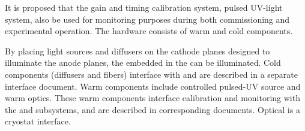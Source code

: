 





It is proposed that the \single {} gain and timing calibration system, pulsed UV-light system, also be used for  monitoring purposes during both commissioning and experimental operation. The hardware consists of warm and cold components.  

By placing light sources and diffusers on the cathode planes designed to illuminate the anode planes, the  embedded in the  can be illuminated. Cold components (diffusers and fibers) interface with  and are described in a separate interface document.  Warm components include controlled pulsed-UV source and warm optics. These warm components interface calibration and monitoring  with the  and  subsystems, and are described in corresponding documents.  Optical \fdth is a cryostat interface. 

